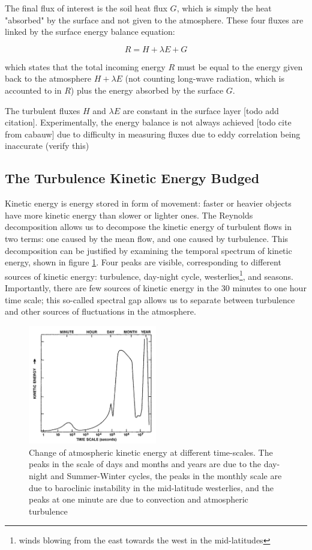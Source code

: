 \documentclass[12pt]{book}
\begin{document}
The final flux of interest is the soil heat flux $G$, which is simply the heat "absorbed" by the surface and not given to the atmosphere. These four fluxes are linked by the surface energy balance equation:

$$
R=H+\lambda E+G
$$

which states that the total incoming energy $R$ must be equal to the energy given back to the atmosphere $H+\lambda E$ (not counting long-wave radiation, which is accounted to in $R$) plus the energy absorbed by the surface $G$.

The turbulent fluxes $H$ and $\lambda E$ are constant in the surface layer [todo add citation]. Experimentally, the energy balance is not always achieved [todo cite from cabauw] due to difficulty in measuring fluxes due to eddy correlation being inaccurate (verify this)

\subsection{The Turbulence Kinetic Energy Budged}
Kinetic energy is energy stored in form of movement: faster or heavier objects have more kinetic energy than slower or lighter ones. The Reynolds decomposition allows us to decompose the kinetic energy of turbulent flows in two terms: one caused by the mean flow, and one caused by turbulence. This decomposition can be justified by examining the temporal spectrum of kinetic energy, shown in figure \ref{fig:tkespectrum}. Four peaks are visible, corresponding to different sources of kinetic energy: turbulence, day-night cycle, westerlies\footnote{winds blowing from the east towards the west in the mid-latitudes}, and seasons. Importantly, there are few sources of kinetic energy in the 30 minutes to one hour time scale; this so-called spectral gap allows us to separate between turbulence and other sources of fluctuations in the atmosphere.

\begin{figure}
\caption{Change of atmospheric kinetic energy at different time-scales. The peaks in the scale of days and months and years are due to the day-night and Summer-Winter cycles, the peaks in the monthly scale are due to baroclinic instability in the mid-latitude westerlies, and the peaks at one minute are due to convection and atmospheric turbulence \cite{tkespectrumsrc,tkespectrumorig}}
\label{fig:tkespectrum}
\centering
\includegraphics[width=0.5\textwidth]{images/kinetic_energy_spectrum}
\end{figure}
\end{document}
